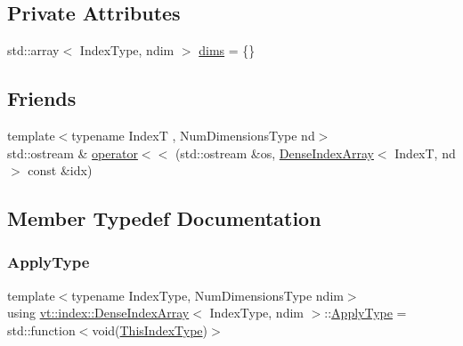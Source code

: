 \subsection*{Private Attributes}
\begin{DoxyCompactItemize}
\item 
std\+::array$<$ Index\+Type, ndim $>$ \hyperlink{structvt_1_1index_1_1_dense_index_array_a85e08cf36301f829ba9a15257c65f39c}{dims} = \{\}
\end{DoxyCompactItemize}
\subsection*{Friends}
\begin{DoxyCompactItemize}
\item 
{\footnotesize template$<$typename IndexT , Num\+Dimensions\+Type nd$>$ }\\std\+::ostream \& \hyperlink{structvt_1_1index_1_1_dense_index_array_ad8dd7b7925f5c66e3264bd14c3e4f2ce}{operator$<$$<$} (std\+::ostream \&os, \hyperlink{structvt_1_1index_1_1_dense_index_array}{Dense\+Index\+Array}$<$ IndexT, nd $>$ const \&idx)
\end{DoxyCompactItemize}


\subsection{Member Typedef Documentation}
\mbox{\label{structvt_1_1index_1_1_dense_index_array_ab44b9e5a65d28520268523fbe99f6a9d}} 
\subsubsection{\texorpdfstring{Apply\+Type}{ApplyType}}
{\footnotesize\ttfamily template$<$typename Index\+Type, Num\+Dimensions\+Type ndim$>$ \\
using \hyperlink{structvt_1_1index_1_1_dense_index_array}{vt\+::index\+::\+Dense\+Index\+Array}$<$ Index\+Type, ndim $>$\+::\hyperlink{structvt_1_1index_1_1_dense_index_array_ab44b9e5a65d28520268523fbe99f6a9d}{Apply\+Type} =  std\+::function$<$void(\hyperlink{structvt_1_1index_1_1_dense_index_array_a6915511f6a82dff2522d6e8c2be20f2a}{This\+Index\+Type})$>$}

